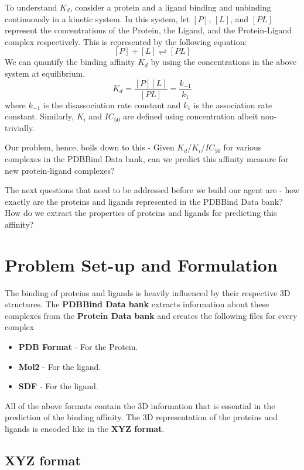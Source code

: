 \documentclass[11pt]{article}
\begin{document}
To understand $K_d$, consider a protein and a ligand binding and unbinding continuously in a kinetic system.
In this system, let $[P]$, $[L]$, and $[PL]$ represent the concentrations of the Protein, the Ligand, and the Protein-Ligand complex respectively.
This is represented by the following equation:
$$[P] + [L] \rightleftharpoons [PL]$$
We can quantify the binding affinity $K_d$ by using the concentrations in the above system at equilibrium.
$$K_d = \frac{[P][L]}{[PL]} = \frac{k_{-1}}{k_1}$$
where $k_{-1}$ is the disassociation rate constant and $k_1$ is the association rate constant.
Similarly, $K_i$ and $IC_{50}$ are defined using concentration albeit non-trivially. 
\cite{binding_affinity_description}

Our problem, hence, boils down to this - Given $K_d$/$K_i$/$IC_{50}$ for various complexes in the PDBBind Data bank,
can we predict this affinity measure for new protein-ligand complexes?

The next questions that need to be addressed before we build our agent are - how exactly are the proteins and ligands represented in the PDBBind Data bank?
How do we extract the properties of proteins and ligands for predicting this affinity?

\section{Problem Set-up and Formulation}

The binding of proteins and ligands is heavily influenced by their respective 3D structures.
The \textbf{PDBBind Data bank} extracts information about these complexes from the \textbf{Protein Data bank} and creates the following files for every complex
\begin{itemize}
\item \textbf{PDB Format} - For the Protein.
\item  \textbf{Mol2} - For the ligand.
\item \textbf{SDF} - For the ligand.
\end{itemize}

All of the above formats contain the 3D information that is essential in the prediction of the binding affinity.
The 3D representation of the proteins and ligands is encoded like in the \textbf{XYZ format}.

\subsection{XYZ format}
\end{document}
